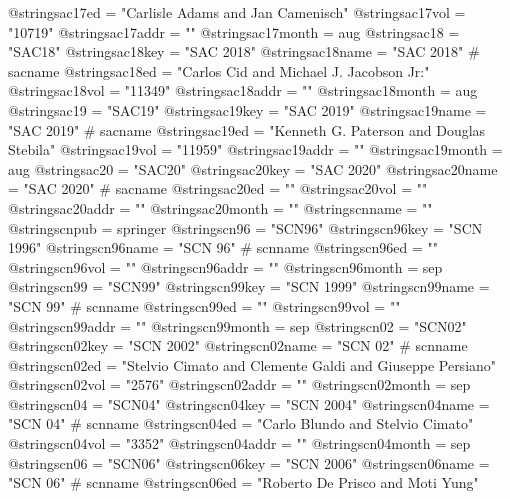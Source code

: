 @string{sac17ed =               "Carlisle Adams and Jan Camenisch"}
@string{sac17vol =              "10719"}
@string{sac17addr =             ""}
@string{sac17month =            aug}
@string{sac18 =                 "SAC18"}
@string{sac18key =              "SAC 2018"}
@string{sac18name =             "SAC 2018" # sacname}
@string{sac18ed =               "Carlos Cid and Michael J. {Jacobson Jr}:"}
@string{sac18vol =              "11349"}
@string{sac18addr =             ""}
@string{sac18month =            aug}
@string{sac19 =                 "SAC19"}
@string{sac19key =              "SAC 2019"}
@string{sac19name =             "SAC 2019" # sacname}
@string{sac19ed =               "Kenneth G. Paterson and Douglas Stebila"}
@string{sac19vol =              "11959"}
@string{sac19addr =             ""}
@string{sac19month =            aug}
@string{sac20 =                 "SAC20"}
@string{sac20key =              "SAC 2020"}
@string{sac20name =             "SAC 2020" # sacname}
@string{sac20ed =               ""}
@string{sac20vol =              ""}
@string{sac20addr =             ""}
@string{sac20month =            ""}
@string{scnname =               ""}
@string{scnpub =                springer}
@string{scn96 =                 "SCN96"}
@string{scn96key =              "SCN 1996"}
@string{scn96name =             "SCN 96" # scnname}
@string{scn96ed =               ""}
@string{scn96vol =              ""}
@string{scn96addr =             ""}
@string{scn96month =            sep}
@string{scn99 =                 "SCN99"}
@string{scn99key =              "SCN 1999"}
@string{scn99name =             "SCN 99" # scnname}
@string{scn99ed =               ""}
@string{scn99vol =              ""}
@string{scn99addr =             ""}
@string{scn99month =            sep}
@string{scn02 =                 "SCN02"}
@string{scn02key =              "SCN 2002"}
@string{scn02name =             "SCN 02" # scnname}
@string{scn02ed =               "Stelvio Cimato and Clemente Galdi and Giuseppe Persiano"}
@string{scn02vol =              "2576"}
@string{scn02addr =             ""}
@string{scn02month =            sep}
@string{scn04 =                 "SCN04"}
@string{scn04key =              "SCN 2004"}
@string{scn04name =             "SCN 04" # scnname}
@string{scn04ed =               "Carlo Blundo and Stelvio Cimato"}
@string{scn04vol =              "3352"}
@string{scn04addr =             ""}
@string{scn04month =            sep}
@string{scn06 =                 "SCN06"}
@string{scn06key =              "SCN 2006"}
@string{scn06name =             "SCN 06" # scnname}
@string{scn06ed =               "Roberto De Prisco and Moti Yung"}
